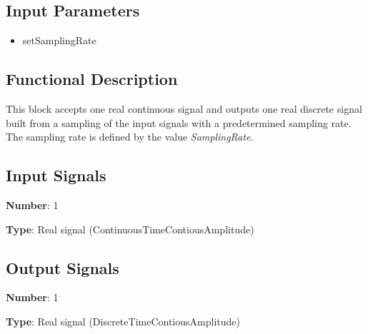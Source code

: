 \documentclass[../../sdf/tex/BPSK_system.tex]{subfiles}
\begin{document}
\onlyinsubfile{\maketitle}

\subsection*{Input Parameters}

\begin{multicols}{2}
	\begin{itemize}
		\item setSamplingRate
	\end{itemize}
\end{multicols}

\subsection*{Functional Description}

This block accepts one real continuous signal and outputs one real discrete signal built from a sampling of the input signals with a predetermined sampling rate. The sampling rate is defined by the value \textit{SamplingRate}.

\subsection*{Input Signals}

\textbf{Number}: 1

\textbf{Type}: Real signal (ContinuousTimeContiousAmplitude)

\subsection*{Output Signals}

\textbf{Number}: 1

\textbf{Type}: Real signal (DiscreteTimeContiousAmplitude)
\end{document}
